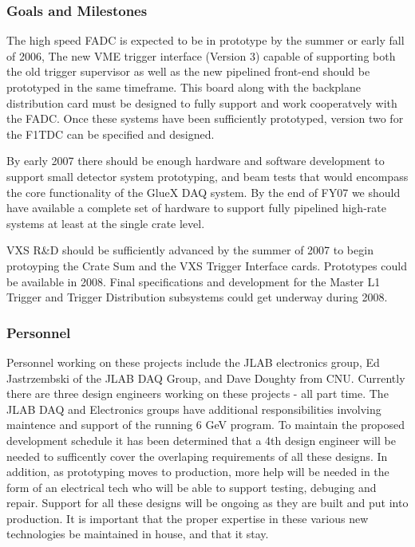 \documentclass[10pt]{article}
\begin{document}
\subsubsection*{Goals and Milestones}

The high speed FADC is expected to be in prototype by the summer or early fall of 2006,
The new VME trigger interface (Version 3) capable of supporting both the old
trigger supervisor as well as the new pipelined front-end should be prototyped in the
same timeframe. This board along with the backplane distribution card must be designed
to fully support and work cooperatvely with the FADC. Once these systems have been 
sufficiently prototyped, version two for the F1TDC can be specified and designed. 

By early 2007 there should be enough hardware and software development to
support small detector system prototyping, and beam tests that would
encompass the core functionality of the GlueX DAQ system. By the end of FY07 we should
have available a complete set of hardware to support fully pipelined high-rate
systems at least at the single crate level.

VXS R\&D should be sufficiently advanced by the summer of 2007 to begin protoyping the
Crate Sum and the VXS Trigger Interface cards. Prototypes could be available in 2008. Final
specifications and development for the Master L1 Trigger and Trigger Distribution subsystems
could get underway during 2008.



\subsubsection*{Personnel}

Personnel working on these projects include the JLAB electronics group, Ed Jastrzembski
of the JLAB DAQ Group, and Dave Doughty from CNU. Currently there are three design engineers working 
on these projects - all part time. The JLAB DAQ and Electronics groups have additional responsibilities
involving maintence and support of the running 6 GeV program. To maintain the proposed development schedule 
it has been determined that a 4th design engineer will be needed to sufficently cover the overlaping 
requirements of all these designs. In addition, as prototyping moves to production, more help will be needed in
the form of an electrical tech who will be able to support testing, debuging and repair. Support for all
these designs will be ongoing as they are built and put into production. It is important that the proper expertise
in these various new technologies be maintained in house, and that it stay.
\end{document}
